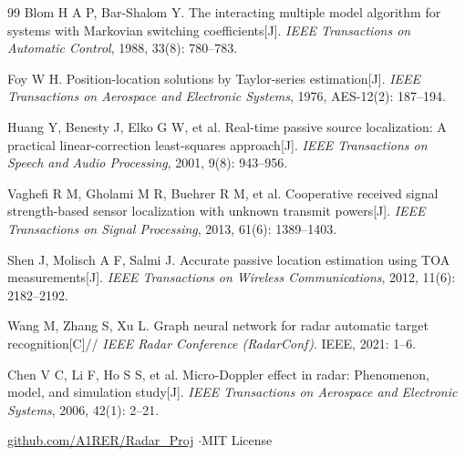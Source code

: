 \documentclass[12pt, a4paper]{article}
\begin{document}
\begin{thebibliography}{99}
Blom H A P, Bar-Shalom Y.
The interacting multiple model algorithm for systems with Markovian switching coefficients[J].
\textit{IEEE Transactions on Automatic Control}, 1988, 33(8): 780--783.

Foy W H.
Position-location solutions by Taylor-series estimation[J].
\textit{IEEE Transactions on Aerospace and Electronic Systems}, 1976, AES-12(2): 187--194.

Huang Y, Benesty J, Elko G W, et al.
Real-time passive source localization: A practical linear-correction least-squares approach[J].
\textit{IEEE Transactions on Speech and Audio Processing}, 2001, 9(8): 943--956.

Vaghefi R M, Gholami M R, Buehrer R M, et al.
Cooperative received signal strength-based sensor localization with unknown transmit powers[J].
\textit{IEEE Transactions on Signal Processing}, 2013, 61(6): 1389--1403.

Shen J, Molisch A F, Salmi J.
Accurate passive location estimation using TOA measurements[J].
\textit{IEEE Transactions on Wireless Communications}, 2012, 11(6): 2182--2192.

Wang M, Zhang S, Xu L.
Graph neural network for radar automatic target recognition[C]//
\textit{IEEE Radar Conference (RadarConf)}.
IEEE, 2021: 1--6.

Chen V C, Li F, Ho S S, et al.
Micro-Doppler effect in radar: Phenomenon, model, and simulation study[J].
\textit{IEEE Transactions on Aerospace and Electronic Systems}, 2006, 42(1): 2--21.

\end{thebibliography}

\vspace{1.5cm}
\begin{center}
  \color{gray}\small
  \href{https://github.com/A1RER/Radar_Proj}{github.com/A1RER/Radar\_Proj}
  \quad$\cdot$\quad MIT License
\end{center}
\end{document}
